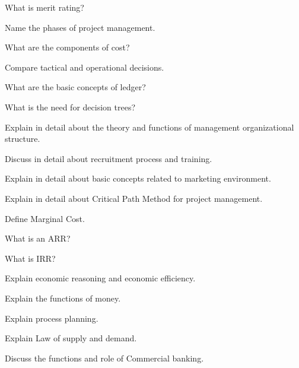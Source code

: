 \ene

\newpage \again

\sectionPM

\partA

\iitem What is merit rating? 
\item Name the phases of project management. 
\item What are the components of cost? \marka

\partBt

\item Compare tactical and operational decisions. 
\item What are the basic concepts of ledger? 
\item What is the need for decision trees? 

\partC

\item Explain in detail about the theory and functions of management
  organizational structure.

\Or
\item Discuss in detail about recruitment process and training. 

\item Explain in detail about basic concepts related to marketing environment. 
\Or
\item Explain in detail about Critical Path Method for project management. 

\ene

\newpage

\sub{\subj}
\maxtime

\separate
\sectionEE
\partA

\iitem Define Marginal Cost. 
\item What is an ARR? 
\item What is IRR? \marka

\partBt

\item Explain economic reasoning and economic efficiency. 
\item Explain the functions of money. 
\item Explain process planning. 

\partCo

\item Explain Law of supply and demand. 
\Or
\item Discuss the functions and role of Commercial banking. 

